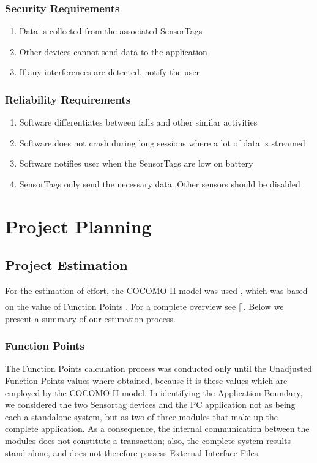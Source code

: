 \documentclass[conference,12pt]{IEEETran}
\begin{document}
\subsubsection{Security Requirements}

\begin{enumerate}
	\item Data is collected from the associated SensorTags
	\item Other devices cannot send data to the application
	\item If any interferences are detected, notify the user
\end{enumerate}


\subsubsection{Reliability Requirements}

\begin{enumerate}
	\item Software differentiates between falls and other similar activities
	\item Software does not crash during long sessions where a lot of data is streamed
	\item Software notifies user when the SensorTags are low on battery
	\item SensorTags only send the necessary data. Other sensors should be disabled
\end{enumerate}

\section{Project Planning}

\subsection{Project Estimation}
For the estimation of effort, the COCOMO II model was used \textsubscript{\cite{cocomo}}, which was based on the value of Function Points \textsuperscript{\cite{albrecht}}. For a complete overview see []. Below we present a summary of our estimation process.

\subsubsection{Function Points}
The Function Points calculation process was conducted only until the Unadjusted Function Points values where obtained, because it is these values which are employed by the COCOMO II model.
In identifying the Application Boundary, we considered the two Sensortag devices and the PC application not as being each a standalone system, but as two of three modules that make up the complete application. As a consequence, the internal communication between the modules does not constitute a transaction; also, the complete system results stand-alone, and does not therefore possess External Interface Files.
\end{document}
